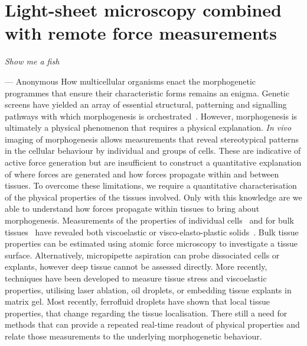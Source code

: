 \ifpdf
    \graphicspath{{Chapter/tweezers/Figs/Raster/}{Chapter/tweezers/Figs/PDF/}{Chapter/tweezers/Figs/}}
\else
    \graphicspath{{Chapter/tweezers/Figs/Vector/}{Chapter/tweezers/Figs/}}
\fi

\chapter[Light-sheet microscopy combined with remote force measurements]{Light-sheet microscopy combined with remote force measurements}\label{chapter:tweezers}
\epigraph{\emph{Show me a fish}}{}{--- Anonymous}
How multicellular organisms enact the morphogenetic programmes that ensure their characteristic forms remains an enigma.
Genetic screens have yielded an array of essential structural, patterning and signalling pathways with which morphogenesis is orchestrated~\cite{gilbertDevelopmentalBiology2000}.
However, morphogenesis is ultimately a physical phenomenon that requires a physical explanation.
\emph{In vivo} imaging of morphogenesis allows measurements that reveal stereotypical patterns in the cellular behaviour by individual and groups of cells.
These are indicative of active force generation but are insufficient to construct a quantitative explanation of where forces are generated and how forces propagate within and between tissues.
To overcome these limitations, we require a quantitative characterisation of the physical properties of the tissues involved.
Only with this knowledge are we able to understand how forces propagate within tissues to bring about morphogenesis.
Measurements of the properties of individual cells~\cite{1}
and for bulk tissues~\cite{2}
have revealed both viscoelastic or visco-elasto-plastic solids~\cite{3}.
Bulk tissue properties can be estimated using atomic force microscopy to investigate a tissue surface. \cite{18}
Alternatively, micropipette aspiration can probe dissociated cells or explants, however deep tissue cannot be assessed directly. \cite{?}
More recently, techniques have been developed to measure tissue stress and viscoelastic properties, utilising laser ablation, oil droplets, or embedding tissue explants in matrix gel.
Most recently, ferrofluid droplets have shown that local tissue properties, that change regarding the tissue localisation. \cite{?}
There still a need for methods that can provide a repeated real-time readout of physical properties and relate those measurements to the underlying morphogenetic behaviour.

